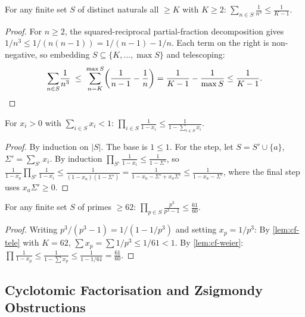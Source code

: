 \begin{lemma}\label{lem:cf-tele}
For any finite set $S$ of distinct naturals all $\ge K$ with $K \ge 2$:
$\displaystyle\sum_{n \in S} \frac{1}{n^3} \le \frac{1}{K-1}$.
\end{lemma}
\begin{proof}
For $n \ge 2$, the squared-reciprocal partial-fraction decomposition gives
$1/n^3 \le 1/(n(n-1)) = 1/(n-1) - 1/n$. Each term on the right is non-negative, so
embedding $S \subseteq \{K, \ldots, \max S\}$ and telescoping:
\[
  \sum_{n \in S}\!\frac{1}{n^3}
  \;\le\;
  \sum_{n=K}^{\max S}\!\left(\frac{1}{n-1}-\frac{1}{n}\right)
  = \frac{1}{K-1} - \frac{1}{\max S}
  \le \frac{1}{K-1}. \qedhere
\]
\end{proof}

\begin{lemma}\label{lem:cf-weier}
For $x_i > 0$ with $\sum_{i \in S} x_i < 1$:
$\prod_{i \in S} \frac{1}{1 - x_i} \le \frac{1}{1 - \sum_{i \in S} x_i}$.
\end{lemma}
\begin{proof}
By induction on $|S|$.  The base is $1 \le 1$.
For the step, let $S = S' \cup \{a\}$, $\Sigma' = \sum_{S'} x_i$.
By induction $\prod_{S'}\frac{1}{1-x_i} \le \frac{1}{1-\Sigma'}$, so
$\frac{1}{1-x_a}\prod_{S'}\frac{1}{1-x_i} \le \frac{1}{(1-x_a)(1-\Sigma')} = \frac{1}{1 - x_a - \Sigma' + x_a\Sigma'} \le \frac{1}{1 - x_a - \Sigma'}$,
where the final step uses $x_a \Sigma' \ge 0$.
\end{proof}

\begin{theorem}\label{thm:cf-assembly}
For any finite set $S$ of primes $\ge 62$:
$\prod_{p \in S} \frac{p^3}{p^3-1} \le \frac{61}{60}$.
\end{theorem}
\begin{proof}
Writing $p^3/(p^3-1) = 1/(1-1/p^3)$ and setting $x_p = 1/p^3$:
By \cref{lem:cf-tele} with $K=62$,
$\sum x_p = \sum 1/p^3 \le 1/61 < 1$.
By \cref{lem:cf-weier}:
$\prod \frac{1}{1-x_p} \le \frac{1}{1-\sum x_p} \le \frac{1}{1-1/61} = \frac{61}{60}$.
\end{proof}

\subsection{Cyclotomic Factorisation and Zsigmondy Obstructions}
\label{subsec:cyclotomic_zsigmondy}

